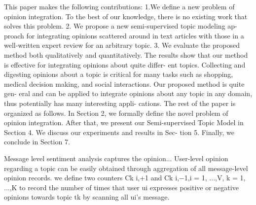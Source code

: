 \documentclass[runningheads,a4paper]{llncs}
\begin{document}
This paper makes the following contributions:
1.We define a new problem of opinion integration. To the best of our knowledge, there is no existing work that solves this problem.
2. We propose a new semi-supervised topic modeling ap- proach for integrating opinions scattered around in text articles with those in a well-written expert review for an arbitrary topic.
3. We evaluate the proposed method both qualitatively and quantitatively. The results show that our method is effective for integrating opinions about quite differ- ent topics.
Collecting and digesting opinions about a topic is critical for many tasks such as shopping, medical decision making, and social interactions. Our proposed method is quite gen- eral and can be applied to integrate opinions about any topic in any domain, thus potentially has many interesting appli- cations. The rest of the paper is organized as follows. In Section 2,
we formally define the novel problem of opinion integration. After that, we present our Semi-supervised Topic Model in Section 4. We discuss our experiments and results in Sec- tion 5. Finally, we conclude in Section 7.



Message level sentiment analysis captures the opinion...
User-level opinion regarding a topic can be easily obtained through aggregation of all message-level opinion records.
we define two counters Ck i,+1 and Ck i,−1,i = 1, ...,V, k = 1, ...,K to record the number of times that user ui expresses positive or negative opinions towards topic tk by scanning all ui’s message.
\cite{li2012mining}
\end{document}
